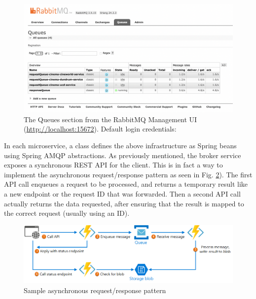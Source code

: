 \begin{figure}[H]
  \centering
  \includegraphics[width=1.0\linewidth]{./assets/images/case-studies/rmq-management.png}
  \caption{The Queues section from the RabbitMQ Management UI (\url{http://localhost:15672}). Default login credentials: }
  \label{fig:rmq-management}
\end{figure}

In each microservice, a   class defines the above infrastructure as Spring beans using Spring AMQP abstractions. As previously mentioned, the broker service exposes a synchronous REST API for the client. This is in fact a way to implement the asynchronous request/response pattern as seen in Fig. \ref{fig:async-req-res}). The first API call enqueues a request to be processed, and returns a temporary result like a new endpoint or the request ID that was forwarded. Then a second API call actually returns the data requested, after ensuring that the result is mapped to the correct request (usually using an ID).

\begin{figure}[H]
  \centering
  \includegraphics[width=0.8\linewidth]{./assets/images/case-studies/async-req-res.png}
  \caption{Sample asynchronous request/response pattern}
  \label{fig:async-req-res}
\end{figure}

